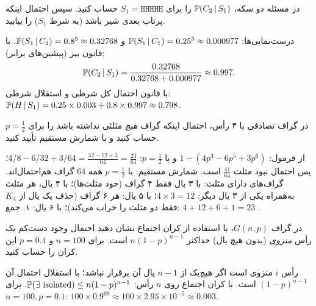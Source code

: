 \begin{exercise}
در مسئله دو سکه، $\mathbb{P}(C_2\,|\, S_1)$ را برای $S_1=\mathtt{HHHHH}$ حساب کنید. سپس احتمال اینکه پرتاب بعدی شیر باشد (به شرط $S_1$) را بیابید.
\end{exercise}
\begin{solution}
درست‌نمایی‌ها: $\mathbb{P}(S_1\,|\, C_1)=0.25^5\approx0.000977$ و $\mathbb{P}(S_1\,|\, C_2)=0.8^5\approx0.32768$. با قانون بیز (پیشین‌های برابر):
\[
\mathbb{P}(C_2\,|\, S_1)=\frac{0.32768}{0.32768+0.000977}\approx0.997 .
\]
با قانون احتمال کل شرطی و استقلال شرطی:
$\mathbb{P}(H\,|\, S_1)=0.25\times0.003+0.8\times0.997\approx0.798$.
\end{solution}

\begin{exercise}
در گراف تصادفی با ۴ رأس، احتمال اینکه گراف \emph{هیچ} مثلثی نداشته باشد را برای $p=\frac12$ حساب کنید و با شمارش مستقیم تأیید کنید.
\end{exercise}
\begin{solution}
از فرمول: $1-(4p^3-6p^5+3p^6)$ و با $p=\frac12$: $4/8-6/32+3/64=\frac{32-12+3}{64}=\frac{23}{64}$؛ پس احتمال نبود مثلث $\frac{41}{64}$ است. شمارش مستقیم: با $p=\frac12$ همه $64$ گراف هم‌احتمال‌اند. گراف‌های دارای مثلث: با ۳ یال فقط ۴ گراف (خود مثلث‌ها)؛ با ۴ یال، هر مثلث به‌همراه یکی از ۳ یال دیگر: $4\times3=12$؛ با ۵ یال: هر ۶ گراف (حذف یک یال از $K_4$ فقط دو مثلث را خراب می‌کند)؛ با ۶ یال: ۱. جمع: $4+12+6+1=23$ \checkmark.
\end{solution}

\begin{exercise}
در گراف $G(n,p)$، با استفاده از کران اجتماع نشان دهید احتمال وجود دست‌کم یک رأس \emph{منزوی} (بدون هیچ یال) حداکثر $n(1-p)^{n-1}$ است. برای $n=100$ و $p=0.1$ این کران را حساب کنید.
\end{exercise}
\begin{solution}
رأس $i$ منزوی است اگر هیچ‌یک از $n-1$ یال آن برقرار نباشد؛ با استقلال احتمال آن $(1-p)^{n-1}$ است. با کران اجتماع روی $n$ رأس: $\mathbb{P}(\exists\text{ isolated})\le n(1-p)^{n-1}$. برای $n=100,p=0.1$: $100\times0.9^{99}\approx100\times2.95\times10^{-5}\approx0.003$.
\end{solution}
